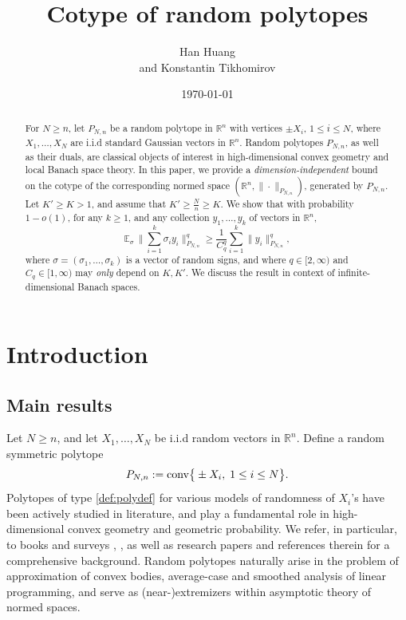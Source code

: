 \documentclass[11pt]{amsart}
\title{Cotype of random polytopes}
\author{Han Huang\address{Department of Mathematics, University of Missouri, Columbia}\email{hhuang@missouri.edu} 
and Konstantin Tikhomirov\address{Department of Mathematical Sciences, Carnegie Mellon University}\email{ktikhomi@andrew.cmu.edu}}
\date{\today}
\theoremstyle{definition}
\theoremstyle{plain}
\newcommand{\R}{\mathbb{R}}
\def\R{{\mathbb R}}
\def\Exp{{\mathbb E}}
\def\conv{{\rm conv}}
\begin{document}
\maketitle

\begin{abstract}
For $N\geq n$,
let $P_{N,n}$ be a random polytope in $\R^n$
with vertices $\pm X_i$, $1\leq i\leq N$,
where $X_1,\dots,X_N$ are i.i.d standard Gaussian vectors in
$\R^n$.
Random polytopes $P_{N,n}$, as well as their duals,
are classical objects of interest in high-dimensional
convex geometry and local Banach space theory.
In this paper, we provide a 
{\it dimension-independent} bound
on the cotype of the corresponding 
normed space $(\R^n,\|\cdot\|_{P_{N,n}})$,
generated by $P_{N,n}$.
Let $K'\geq K>1$, and assume that
$K'\geq \frac{N}{n}\geq K$.
We show that with probability $1-o(1)$,
for any $k\geq 1$, and any collection 
$y_1,\dots,y_k$ of vectors in $\R^n$,
$$
\Exp_\sigma\,\Big\|\sum_{i=1}^k \sigma_i y_i\Big\|_{P_{N,n}}^q
\geq \frac{1}{C_q^q}\sum_{i=1}^k \big\|y_i\big\|_{P_{N,n}}^q,
$$
where $\sigma=(\sigma_1,\dots,\sigma_k)$
is a vector of random signs,
and where
$q\in [2,\infty)$ and $C_q\in[1,\infty)$
may {\it only} depend on $K,K'$.
We discuss the result in context of infinite-dimensional
Banach spaces.
\end{abstract}



\section{Introduction}


\subsection{Main results}
Let $N\geq n$, and let $X_1,\dots,X_N$
be i.i.d random vectors in $\R^n$.
Define a random symmetric polytope 
\begin{equation}\label{def:polydef}
P_{N,n}:=\conv\big\{\pm X_i,\;1\leq i\leq N\big\}.    
\end{equation}
Polytopes of type \eqref{def:polydef}
for various models of randomness of $X_i$'s
have been actively studied in literature,
and play a fundamental role in
high-dimensional convex geometry
and geometric probability.
We refer, in particular, to books and surveys
\cite{WW93,Barany2004,Schneider2008,Reitzner2010}, \cite[Section~8.2]{SW2008},
as well as research papers
\cite{RS1963,E1965,B1989,Muller89,AS92,BV94,K1994,HMR04,Retzner2005-,Retzner2005,LPRT2005,Vu2005,Vu2006,Bor2009,AGP2015,GKZ20,KZ19,KZ2020,Ka2021} and references therein
for a comprehensive background.
Random polytopes naturally arise in the problem of
approximation of convex bodies, average-case and
smoothed analysis of linear programming,
and serve as (near-)extremizers
within asymptotic theory of normed spaces.
\end{document}
